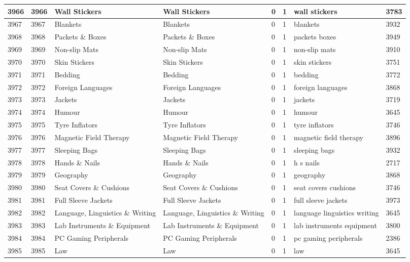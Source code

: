 \begin{longtable}{|l|l|l|l|l|l|l|l|}
3966 & 3966 & Wall Stickers & Wall Stickers & 0 & 1 & wall stickers & 3783 \\ \hline 
3967 & 3967 & Blankets & Blankets & 0 & 1 & blankets & 3932 \\ \hline 
3968 & 3968 & Packets \& Boxes & Packets \& Boxes & 0 & 1 & packets boxes & 3949 \\ \hline 
3969 & 3969 & Non-slip Mats & Non-slip Mats & 0 & 1 & non-slip mats & 3910 \\ \hline 
3970 & 3970 & Skin Stickers & Skin Stickers & 0 & 1 & skin stickers & 3751 \\ \hline 
3971 & 3971 & Bedding & Bedding & 0 & 1 & bedding & 3772 \\ \hline 
3972 & 3972 & Foreign Languages & Foreign Languages & 0 & 1 & foreign languages & 3868 \\ \hline 
3973 & 3973 & Jackets & Jackets & 0 & 1 & jackets & 3719 \\ \hline 
3974 & 3974 & Humour & Humour & 0 & 1 & humour & 3645 \\ \hline 
3975 & 3975 & Tyre Inflators & Tyre Inflators & 0 & 1 & tyre inflators & 3746 \\ \hline 
3976 & 3976 & Magnetic Field Therapy & Magnetic Field Therapy & 0 & 1 & magnetic field therapy & 3896 \\ \hline 
3977 & 3977 & Sleeping Bags & Sleeping Bags & 0 & 1 & sleeping bags & 3932 \\ \hline 
3978 & 3978 & Hands \& Nails & Hands \& Nails & 0 & 1 & h s nails & 2717 \\ \hline 
3979 & 3979 & Geography & Geography & 0 & 1 & geography & 3868 \\ \hline 
3980 & 3980 & Seat Covers \& Cushions & Seat Covers \& Cushions & 0 & 1 & seat covers cushions & 3746 \\ \hline 
3981 & 3981 & Full Sleeve Jackets & Full Sleeve Jackets & 0 & 1 & full sleeve jackets & 3973 \\ \hline 
3982 & 3982 & Language, Linguistics \& Writing & Language, Linguistics \& Writing & 0 & 1 & language linguistics writing & 3645 \\ \hline 
3983 & 3983 & Lab Instruments \& Equipment & Lab Instruments \& Equipment & 0 & 1 & lab instruments equipment & 3800 \\ \hline 
3984 & 3984 & PC Gaming Peripherals & PC Gaming Peripherals & 0 & 1 & pc gaming peripherals & 2386 \\ \hline 
3985 & 3985 & Law & Law & 0 & 1 & law & 3645 \\ \hline 

\end{longtable}
